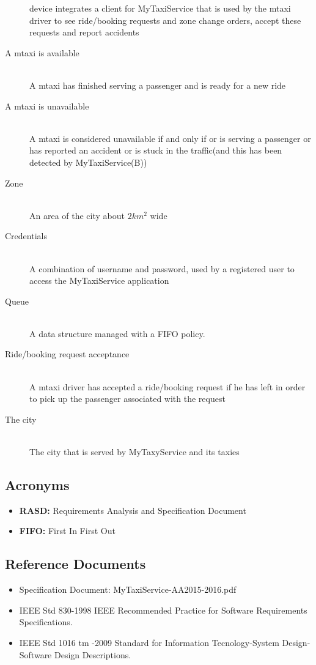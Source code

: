 \documentclass[11pt,titlepage]{article} %
\begin{document}
\begin{description}
	      device integrates a client for MyTaxiService that is used by the mtaxi driver to see ride/booking requests and zone change orders, accept
	      these requests and report accidents
	      \item [A mtaxi is available] \hfill \\ A mtaxi has finished serving a passenger and is ready for a new ride
	      \item [A mtaxi is unavailable]\hfill \\ A mtaxi is considered unavailable if and only if or is serving a passenger or has reported an accident or
	      is stuck in the traffic(and this has been detected by MyTaxiService(B))
	      \item [Zone] \hfill \\An area of the city about $2km^2$ wide
	      \item [Credentials] \hfill \\ A combination of username and password, used by a registered user to access the MyTaxiService application
	      \item [Queue] \hfill \\ A data structure managed with a FIFO policy.
	      \item [Ride/booking request acceptance] \hfill \\ A mtaxi driver has accepted a ride/booking request if he has left in order to pick up the passenger
	      associated with the request
	      \item [The city] \hfill \\The city that is served by MyTaxyService and its taxies
	\end{description}

    \subsection{Acronyms}
      \begin{itemize}
		\item \textbf{RASD:} Requirements Analysis and Specification Document
      		\item \textbf{FIFO:} First In First Out
      \end{itemize}

    \subsection{Reference Documents}
	\begin{itemize}
	      \item Specification Document: MyTaxiService-AA2015-2016.pdf
	      \item IEEE Std 830-1998 IEEE Recommended Practice for Software Requirements Specifications.
	      \item  IEEE Std 1016 tm -2009 Standard for Information Tecnology-System Design-Software Design Descriptions.
	\end{itemize}
\end{document}

